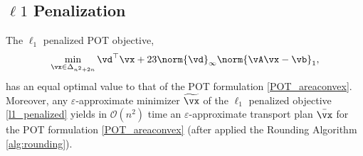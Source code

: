 \subsection{$\ell1$ Penalization}

\begin{lemma}
    \label{lem:l1_regression}
    The $\ell_1$ penalized POT objective,
    \begin{equation} \label{l1_penalized}
        \min_{\vx \in \Delta_{n^2+2n}} \vd^\top \vx + 23 \norm{\vd}_\infty \norm{\vA \vx - \vb}_1,
    \end{equation}
    has an equal optimal value to that of the POT formulation \eqref{POT_areaconvex}. Moreover, any $\varepsilon$-approximate minimizer $\widetilde{\vx}$ of the $\ell_1$ penalized objective \eqref{l1_penalized} yields in $\mathcal{O}(n^2)$ time an $\varepsilon$-approximate transport plan $\bar{\vx}$ for the POT formulation \eqref{POT_areaconvex} (after applied the Rounding Algorithm \ref{alg:rounding}).
\end{lemma}
